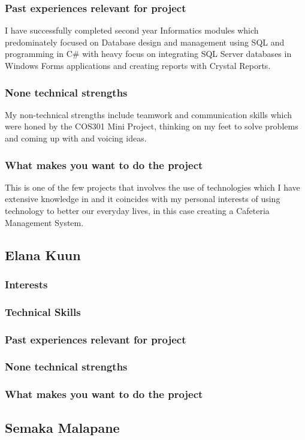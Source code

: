 \documentclass[hidelinks, 12pt, oneside]{article}
\begin{document}
\subsubsection{Past experiences relevant for project}
I have successfully completed second year Informatics modules which predominately focused on Database design and management using SQL and programming in C\# with heavy focus on integrating SQL Server databases in Windows Forms applications and creating reports with Crystal Reports.
\subsubsection{None technical strengths}
My non-technical strengths include teamwork and communication skills which were honed by the COS301 Mini Project, thinking on my feet to solve problems and coming up with and voicing ideas.
\subsubsection{What makes you want to do the project}
This is one of the few projects that involves the use of technologies which I have extensive knowledge in and it coincides with my personal interests of using technology to better our everyday lives, in this case creating a Cafeteria Management System.
\subsection{Elana Kuun}
\subsubsection{Interests}
\subsubsection{Technical Skills}
\subsubsection{Past experiences relevant for project}
\subsubsection{None technical strengths}
\subsubsection{What makes you want to do the project}

\subsection{Semaka Malapane}
\end{document}
